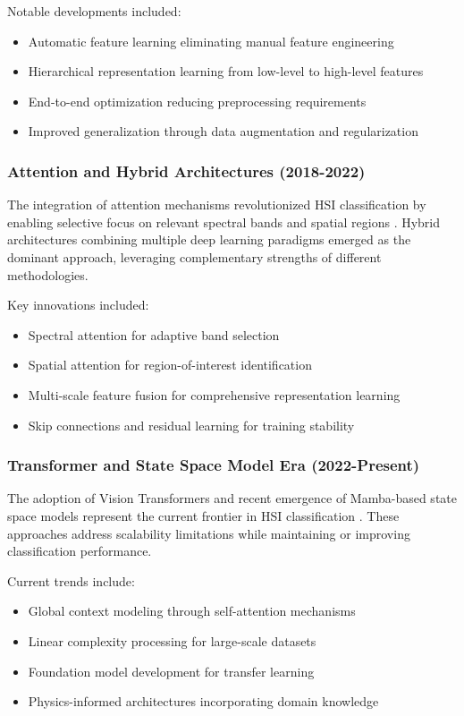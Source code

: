 \documentclass[journal]{IEEEtran}
\begin{document}
Notable developments included:
\begin{itemize}
\item Automatic feature learning eliminating manual feature engineering
\item Hierarchical representation learning from low-level to high-level features
\item End-to-end optimization reducing preprocessing requirements
\item Improved generalization through data augmentation and regularization
\end{itemize}

\subsubsection{Attention and Hybrid Architectures (2018-2022)}

The integration of attention mechanisms revolutionized HSI classification by enabling selective focus on relevant spectral bands and spatial regions \cite{zhu2021residual}. Hybrid architectures combining multiple deep learning paradigms emerged as the dominant approach, leveraging complementary strengths of different methodologies.

Key innovations included:
\begin{itemize}
\item Spectral attention for adaptive band selection
\item Spatial attention for region-of-interest identification
\item Multi-scale feature fusion for comprehensive representation learning
\item Skip connections and residual learning for training stability
\end{itemize}

\subsubsection{Transformer and State Space Model Era (2022-Present)}

The adoption of Vision Transformers and recent emergence of Mamba-based state space models represent the current frontier in HSI classification \cite{hong2021spectralformer, zhu2024mambahsi}. These approaches address scalability limitations while maintaining or improving classification performance.

Current trends include:
\begin{itemize}
\item Global context modeling through self-attention mechanisms
\item Linear complexity processing for large-scale datasets
\item Foundation model development for transfer learning
\item Physics-informed architectures incorporating domain knowledge
\end{itemize}
\end{document}
